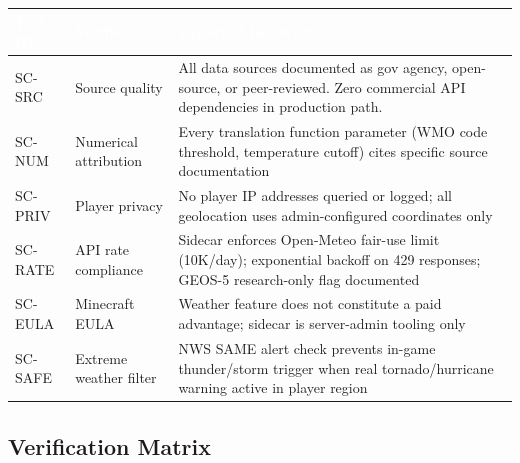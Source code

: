 \documentclass[11pt,letterpaper]{article}
\newcommand{\tableheader}[1]{\textbf{\sffamily\textcolor{white}{#1}}}
\begin{document}
\begin{center}
\begin{tabularx}{\textwidth}{C{1.5cm}L{3.5cm}X}
\toprule
{}
\tableheader{Test ID} & \tableheader{Verifies} & \tableheader{Expected Behavior} \\
\midrule
SC-SRC & Source quality & All data sources documented as gov agency, open-source, or peer-reviewed. Zero commercial API dependencies in production path. \\
SC-NUM & Numerical attribution & Every translation function parameter (WMO code threshold, temperature cutoff) cites specific source documentation \\
SC-PRIV & Player privacy & No player IP addresses queried or logged; all geolocation uses admin-configured coordinates only \\
SC-RATE & API rate compliance & Sidecar enforces Open-Meteo fair-use limit (10K/day); exponential backoff on 429 responses; GEOS-5 research-only flag documented \\
SC-EULA & Minecraft EULA & Weather feature does not constitute a paid advantage; sidecar is server-admin tooling only \\
SC-SAFE & Extreme weather filter & NWS SAME alert check prevents in-game thunder/storm trigger when real tornado/hurricane warning active in player region \\
\bottomrule
\end{tabularx}
\end{center}

\subsection{Verification Matrix}
\end{document}
